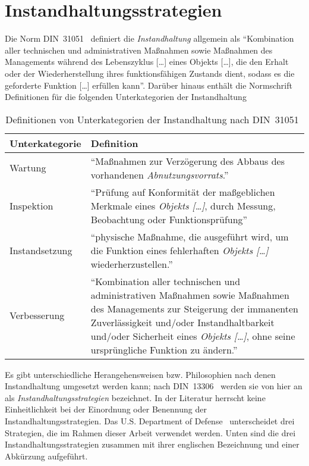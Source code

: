 \chapter{Instandhaltungsstrategien}
\label{ch:instandhaltungsstrategien}
Die Norm DIN~31051~\cite{DIN.2019} definiert die \textit{Instandhaltung} allgemein als \enquote{Kombination aller technischen und administrativen Maßnahmen sowie Maßnahmen des Managements während des Lebenszyklus [\dots] eines Objekts [\dots], die den Erhalt oder der Wiederherstellung ihres funktionsfähigen Zustands dient, sodass es die geforderte Funktion [\dots] erfüllen kann}. Darüber hinaus enthält die Normschrift Definitionen für die folgenden Unterkategorien der Instandhaltung

\begin{table}[ht]
	\centering
	\begin{tabularx}{\textwidth}{ | l | X |}
		\hline
        \rowcolor{lightgray}
        Unterkategorie & Definition\\
        \hline
        Wartung & \enquote{Maßnahmen zur Verzögerung des Abbaus des vorhandenen \textit{Abnutzungsvorrats}.}\\
        \hline
        Inspektion & \enquote{Prüfung auf Konformität der maßgeblichen Merkmale eines \textit{Objekts […]}, durch Messung, Beobachtung oder Funktionsprüfung}\\
        \hline
        Instandsetzung & \enquote{physische Maßnahme, die ausgeführt wird, um die Funktion eines fehlerhaften \textit{Objekts […] }wiederherzustellen.}\\
        \hline
        Verbesserung & \enquote{Kombination aller technischen und administrativen Maßnahmen sowie Maßnahmen des Managements zur Steigerung der immanenten Zuverlässigkeit und/oder Instandhaltbarkeit und/oder Sicherheit eines \textit{Objekts […]}, ohne seine ursprüngliche Funktion zu ändern.}\\
        \hline
	\end{tabularx}
	\caption{Definitionen von Unterkategorien der Instandhaltung nach DIN~{31051}~\cite{DIN.2019}}%
	\label{tab:definition_unterkategorien_instandhaltung}	%
\end{table}

Es gibt unterschiedliche Herangehensweisen bzw. Philosophien nach denen Instandhaltung umgesetzt werden kann; nach DIN~13306~\cite{DIN.2018} werden sie von hier an als \textit{Instandhaltungsstrategien} bezeichnet. In der Literatur herrscht keine Einheitlichkeit bei der Einordnung oder Benennung der Instandhaltungsstrategien. Das U.S. Department of Defense~\cite[S.~16]{U.S.DepartmentofDefense.2008} unterscheidet drei Strategien, die im Rahmen dieser Arbeit verwendet werden. Unten sind die drei Instandhaltungsstrategien zusammen mit ihrer englischen Bezeichnung und einer Abkürzung aufgeführt.

